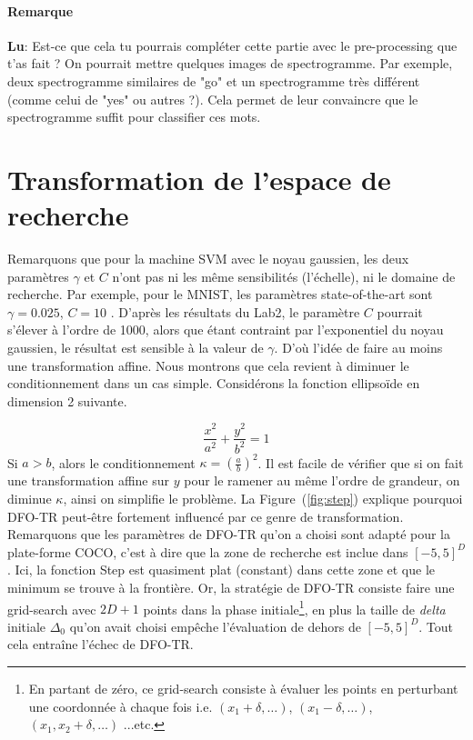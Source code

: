 \documentclass[12 pt, a4paper]{article}
\begin{document}
\paragraph{Remarque}
\textbf{Lu}: Est-ce que cela tu pourrais compléter cette partie avec le pre-processing que t'as fait ? On pourrait mettre quelques images de spectrogramme. Par exemple, deux spectrogramme similaires de "go" et un spectrogramme très différent (comme celui de "yes" ou autres ?). Cela permet de leur convaincre que le spectrogramme suffit pour classifier ces mots.


\section{Transformation de l'espace de recherche}\label{transform}
Remarquons que pour la machine SVM avec le noyau gaussien, les deux paramètres $\gamma$ et $C$ n'ont pas ni les même sensibilités (l'échelle), ni le domaine de recherche. Par exemple, pour le MNIST, les paramètres state-of-the-art sont $\gamma = 0.025$, $C = 10$ \cite{results}. D'après les résultats du Lab2, le paramètre $C$ pourrait s'élever à l'ordre de 1000, alors que étant contraint par l'exponentiel du noyau gaussien, le résultat est sensible à la valeur de $\gamma$. D'où l'idée de faire au moins une transformation affine. Nous montrons que cela revient à diminuer le conditionnement dans un cas simple. Considérons la fonction ellipsoïde en dimension 2 suivante. 

\begin{equation*}
\frac{x^2}{a^2} + \frac{y^2}{b^2} = 1
\end{equation*}
Si $a>b$, alors le conditionnement $\kappa = (\frac{a}{b})^2$. Il est facile de vérifier que si on fait une transformation affine sur $y$ pour le ramener au même l'ordre de grandeur, on diminue $\kappa$, ainsi on simplifie le problème. La Figure~(\ref{fig:step}) explique pourquoi DFO-TR peut-être fortement influencé par ce genre de transformation. Remarquons que les paramètres de DFO-TR qu'on a choisi sont adapté pour la plate-forme COCO, c'est à dire que la zone de recherche est inclue dans $[-5,5]^{D}$. Ici, la fonction Step est quasiment plat (constant) dans cette zone et que le minimum se trouve à la frontière. Or, la stratégie de DFO-TR consiste faire une grid-search avec $2D+1$ points dans la phase initiale\footnote{En partant de zéro, ce grid-search consiste à évaluer les points en perturbant une coordonnée à chaque fois i.e. $(x_{1}+\delta, \ldots)$, $(x_{1}-\delta, \ldots)$, $(x_{1}, x_{2}+\delta, \ldots)$ ...etc.}, en plus la taille de \textit{delta} initiale $\Delta_{0}$ qu'on avait choisi empêche l'évaluation de dehors de $[-5,5]^{D}$. Tout cela entraîne l'échec de DFO-TR.
\end{document}
